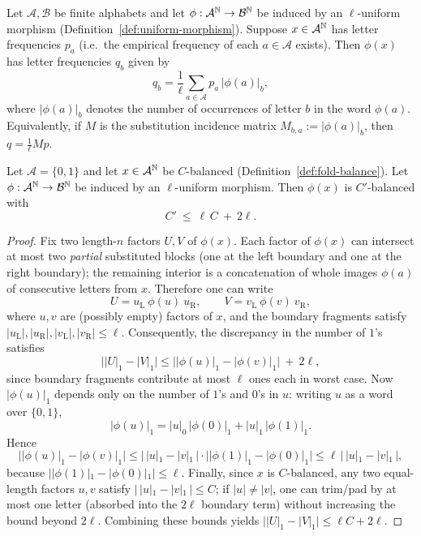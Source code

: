 \begin{proposition}\label{prop:uniform-frequency}
Let $\mathcal{A},\mathcal{B}$ be finite alphabets and let $\phi:\mathcal{A}^{\mathbb{N}}\to\mathcal{B}^{\mathbb{N}}$ be induced by an $\ell$-uniform morphism (Definition~\ref{def:uniform-morphism}). Suppose $x\in\mathcal{A}^{\mathbb{N}}$ has letter frequencies $p_a$ (i.e.\ the empirical frequency of each $a\in\mathcal{A}$ exists). Then $\phi(x)$ has letter frequencies $q_b$ given by
\[
q_b=\frac{1}{\ell}\sum_{a\in\mathcal{A}} p_a\,|\phi(a)|_b,
\]
where $|\phi(a)|_b$ denotes the number of occurrences of letter $b$ in the word $\phi(a)$.
Equivalently, if $M$ is the substitution incidence matrix $M_{b,a}:=|\phi(a)|_b$, then $q=\frac{1}{\ell}Mp$.
\end{proposition}

\begin{proposition}\label{prop:uniform-balance}
Let $\mathcal{A}=\{0,1\}$ and let $x\in\mathcal{A}^{\mathbb{N}}$ be $C$-balanced (Definition~\ref{def:fold-balance}).
Let $\phi:\mathcal{A}^{\mathbb{N}}\to\mathcal{B}^{\mathbb{N}}$ be induced by an $\ell$-uniform morphism.
Then $\phi(x)$ is $C'$-balanced with
\[
C'\ \le\ \ell\,C\ +\ 2\ell.
\]
\end{proposition}

\begin{proof}
Fix two length-$n$ factors $U,V$ of $\phi(x)$.
Each factor of $\phi(x)$ can intersect at most two \emph{partial} substituted blocks (one at the left boundary and one at the right boundary); the remaining interior is a concatenation of whole images $\phi(a)$ of consecutive letters from $x$. Therefore one can write
\[
U = u_{\mathrm{L}}\ \phi(u)\ u_{\mathrm{R}},\qquad
V = v_{\mathrm{L}}\ \phi(v)\ v_{\mathrm{R}},
\]
where $u,v$ are (possibly empty) factors of $x$, and the boundary fragments satisfy $|u_{\mathrm{L}}|,|u_{\mathrm{R}}|,|v_{\mathrm{L}}|,|v_{\mathrm{R}}|\le \ell$.
Consequently, the discrepancy in the number of $1$'s satisfies
\[
\bigl||U|_1-|V|_1\bigr|
\le
\bigl||\phi(u)|_1-|\phi(v)|_1\bigr| \ +\ 2\ell,
\]
since boundary fragments contribute at most $\ell$ ones each in worst case.
Now $|\phi(u)|_1$ depends only on the number of $1$'s and $0$'s in $u$:
writing $u$ as a word over $\{0,1\}$,
\[
|\phi(u)|_1 = |u|_0\,|\phi(0)|_1 + |u|_1\,|\phi(1)|_1.
\]
Hence
\[
\bigl||\phi(u)|_1-|\phi(v)|_1\bigr|
\le
|\,|u|_1-|v|_1\,|\cdot \bigl||\phi(1)|_1-|\phi(0)|_1\bigr|
\le
\ell\,|\,|u|_1-|v|_1\,|,
\]
because $||\phi(1)|_1-|\phi(0)|_1|\le \ell$.
Finally, since $x$ is $C$-balanced, any two equal-length factors $u,v$ satisfy $|\,|u|_1-|v|_1\,|\le C$; if $|u|\neq |v|$, one can trim/pad by at most one letter (absorbed into the $2\ell$ boundary term) without increasing the bound beyond $2\ell$.
Combining these bounds yields $\bigl||U|_1-|V|_1\bigr|\le \ell C + 2\ell$.
\end{proof}


